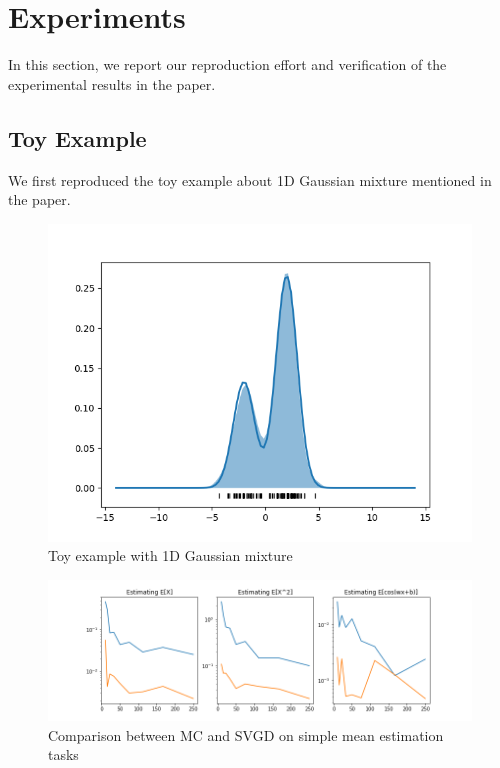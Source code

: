 \section{Experiments}
In this section, we report our reproduction effort and verification of the experimental results in the paper.

\subsection{Toy Example}

We first reproduced the toy example about 1D Gaussian mixture mentioned in the paper. 

\begin{figure}[h]
    \centering
    \includegraphics[width=\textwidth]{original-code/Toy-Examples/mixture1d_iter_500.png}
    \caption{Toy example with 1D Gaussian mixture}
    \label{fig:my_label}
\end{figure}

\begin{figure}[h]
    \centering
    \includegraphics[width=\textwidth]{figs/toy-figure2.png}
    \caption{Comparison between MC and SVGD on simple mean estimation tasks}
    \label{fig:my_label}
\end{figure}

